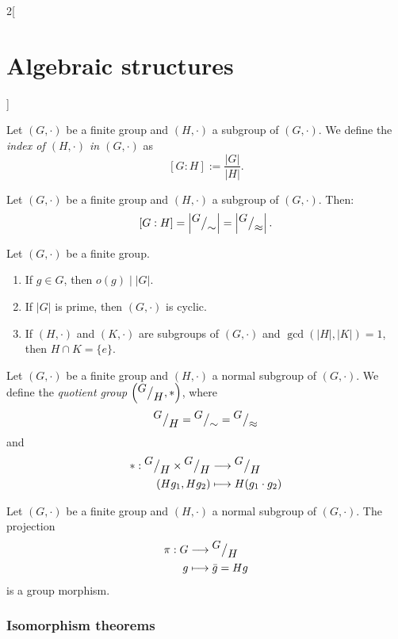\documentclass[class=article,10pt,crop=false]{standalone}
\begin{document}
\begin{multicols}{2}[\section{Algebraic structures}]
\begin{theorem}
\end{theorem}
\begin{definition}
Let $(G,\cdot)$ be a finite group and $(H,\cdot)$ a subgroup of $(G,\cdot)$. We define the \textit{index of $(H,\cdot)$ in $(G,\cdot)$} as $$[G:H]:=\frac{|G|}{|H|}.$$
\end{definition}
\begin{corollary}
Let $(G,\cdot)$ be a finite group and $(H,\cdot)$ a subgroup of $(G,\cdot)$. Then: $$[G:H]=\left|{^{\textstyle G}\big/_{\textstyle \sim}}\right|=\left|{^{\textstyle G}\big/_{\textstyle \approx}}\right|.$$
\end{corollary}
\begin{corollary}
Let $(G,\cdot)$ be a finite group. 
\begin{enumerate}
    \item If $g\in G$, then $o(g)\mid |G|$.
    \item If $|G|$ is prime, then $(G,\cdot)$ is cyclic.
    \item If $(H,\cdot)$ and $(K,\cdot)$ are subgroups of $(G,\cdot)$ and $\gcd(|H|,|K|)=1$, then $H\cap K=\{e\}$.
\end{enumerate}
\end{corollary}
\begin{definition}
Let $(G,\cdot)$ be a finite group and $(H,\cdot)$ a normal subgroup of $(G,\cdot)$. We define the \textit{quotient group $\left({^{\textstyle G}\big/_{\textstyle H}},*\right)$}, where $${^{\textstyle G}\big/_{\textstyle H}}={^{\textstyle G}\big/_{\textstyle \sim}}={^{\textstyle G}\big/_{\textstyle \approx}}$$ and 
\begin{align*}
    *:{^{\textstyle G}\big/_{\textstyle H}}\times{^{\textstyle G}\big/_{\textstyle H}}&\longrightarrow{^{\textstyle G}\big/_{\textstyle H}}\\
    (Hg_1,Hg_2)&\longmapsto H(g_1\cdot g_2)
\end{align*}
\end{definition}
\begin{lemma}
Let $(G,\cdot)$ be a finite group and $(H,\cdot)$ a normal subgroup of $(G,\cdot)$. The projection 
\begin{align*}
    \pi:G&\longrightarrow{^{\textstyle G}\big/_{\textstyle H}}\\
    g&\longmapsto\Bar{g}=Hg
\end{align*}
is a group morphism.
\end{lemma}
\subsubsection*{Isomorphism theorems}
\end{multicols}
\end{document}
